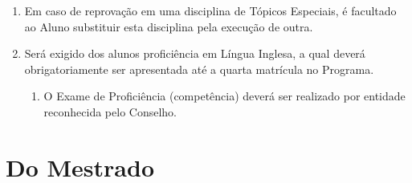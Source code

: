 \documentclass{article}
\newcommand{\singleitem}{\item[Parágrafo Único.]}
\newcommand{\grupoMaior}{Conselho\xspace}
\begin{document}
\begin{enumerate}
    \item Em caso de reprovação em uma disciplina de Tópicos Especiais, é facultado ao Aluno substituir esta disciplina pela execução de outra. 

	\item Será exigido dos alunos proficiência em Língua Inglesa, a qual deverá obrigatoriamente ser apresentada até a quarta matrícula no Programa.
	\begin{enumerate}
		\singleitem O Exame de Proficiência (competência) deverá ser realizado por entidade reconhecida pelo \grupoMaior.
	\end{enumerate}

\end{enumerate}

\section{Do Mestrado}
\end{document}
